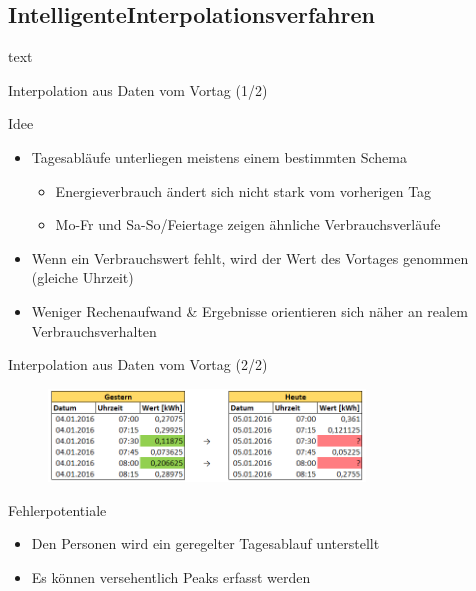 \subsection{\grqq Intelligente\grqq Interpolationsverfahren}
\begin{frame}{\insertsubsectionhead}
text
\end{frame}

\begin{frame}{Interpolation aus Daten vom Vortag (1/2)}
\begin{block}{Idee}
\begin{itemize}
\item Tagesabläufe unterliegen meistens einem bestimmten Schema
\begin{itemize}
\item Energieverbrauch ändert sich nicht stark vom vorherigen Tag
\item Mo-Fr und Sa-So/Feiertage zeigen ähnliche Verbrauchsverläufe
\end{itemize}
\item Wenn ein Verbrauchswert fehlt, wird der Wert des Vortages genommen (gleiche Uhrzeit)
\item Weniger Rechenaufwand \& Ergebnisse orientieren sich näher an realem Verbrauchsverhalten
\end{itemize}
\end{block}
\end{frame}

\begin{frame}{Interpolation aus Daten vom Vortag (2/2)}
\begin{figure}
  \centering
     \includegraphics[width=0.75\textwidth]{pics/yesterday2.png}
  \label{fig:Bild1}
\end{figure}
\begin{block}{Fehlerpotentiale}
\begin{itemize}
\item Den Personen wird ein geregelter Tagesablauf unterstellt
\item Es können versehentlich Peaks erfasst werden
\end{itemize}
\end{block}
\end{frame}

